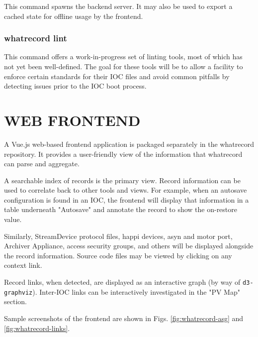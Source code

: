 \documentclass[letter,
               keeplastbox,   %
               ]{jacow}
\begin{document}
This command spawns the backend server.  It may also be used to export a cached
state for offline usage by the frontend.

\subsubsection{whatrecord lint}

This command offers a work-in-progress set of linting tools, most of which
has not yet been well-defined.  The goal for these tools will be to
allow a facility to enforce certain standards for their IOC files
and avoid common pitfalls by detecting issues prior to the IOC boot process.

\section{WEB FRONTEND}

A Vue.js\cite{vuejs} web-based frontend application is packaged separately in
the whatrecord repository.  It provides a user-friendly view of the information
that whatrecord can parse and aggregate.

A searchable index of records is the primary view.  Record information can be
used to correlate back to other tools and views. For example, when an autosave
configuration is found in an IOC, the frontend will display that information in
a table underneath "Autosave" and annotate the record to show the on-restore
value.

Similarly, StreamDevice protocol files, happi devices, asyn and motor port,
Archiver Appliance, access security groups, and others will be displayed
alongside the record information.  Source code files may be viewed by
clicking on any context link.

Record links, when detected, are displayed as an interactive graph (by way of
\verb_d3-graphviz_\cite{d3graphviz}).  Inter-IOC links can be interactively
investigated in the "PV Map" section.

Sample screenshots of the frontend are shown in Figs. \ref{fig:whatrecord-asg}
and \ref{fig:whatrecord-links}.
\end{document}
